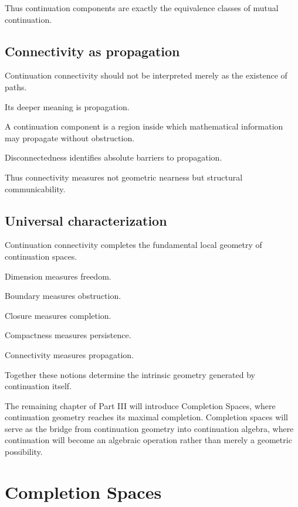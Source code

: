\documentclass[13pt,openany]{book}
\theoremstyle{plain}
\theoremstyle{definition}
\begin{document}
Thus continuation components are exactly the equivalence classes of mutual
continuation.

\section{Connectivity as propagation}

Continuation connectivity should not be interpreted merely as the existence of
paths.

Its deeper meaning is propagation.

A continuation component is a region inside which mathematical information may
propagate without obstruction.

Disconnectedness identifies absolute barriers to propagation.

Thus connectivity measures not geometric nearness but structural
communicability.

\section{Universal characterization}

Continuation connectivity completes the fundamental local geometry of
continuation spaces.

Dimension measures freedom.

Boundary measures obstruction.

Closure measures completion.

Compactness measures persistence.

Connectivity measures propagation.

Together these notions determine the intrinsic geometry generated by
continuation itself.

The remaining chapter of Part III will introduce Completion Spaces, where
continuation geometry reaches its maximal completion. Completion spaces will
serve as the bridge from continuation geometry into continuation algebra, where
continuation will become an algebraic operation rather than merely a geometric
possibility.

\chapter{Completion Spaces}
\end{document}
